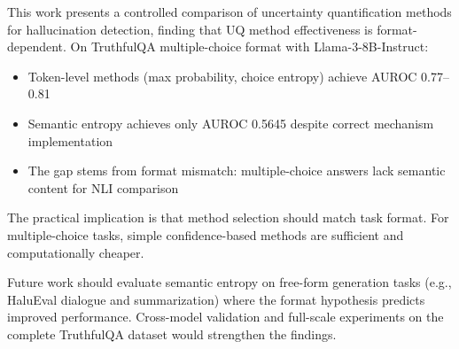 
This work presents a controlled comparison of uncertainty quantification methods for hallucination detection, finding that UQ method effectiveness is format-dependent. On TruthfulQA multiple-choice format with Llama-3-8B-Instruct:

\begin{itemize}
\item Token-level methods (max probability, choice entropy) achieve AUROC 0.77--0.81
\item Semantic entropy achieves only AUROC 0.5645 despite correct mechanism implementation
\item The gap stems from format mismatch: multiple-choice answers lack semantic content for NLI comparison
\end{itemize}

The practical implication is that method selection should match task format. For multiple-choice tasks, simple confidence-based methods are sufficient and computationally cheaper.

Future work should evaluate semantic entropy on free-form generation tasks (e.g., HaluEval dialogue and summarization) where the format hypothesis predicts improved performance. Cross-model validation and full-scale experiments on the complete TruthfulQA dataset would strengthen the findings.

